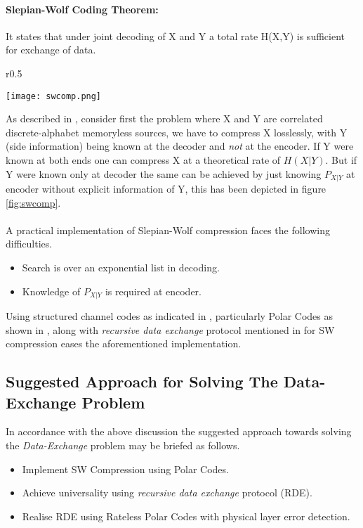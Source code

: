 \documentclass[
11pt, %
a4paper, %
oneside, %
headinclude,footinclude, %
BCOR5mm, %
]{scrartcl}
\begin{document}
\paragraph{Slepian-Wolf Coding Theorem:}It states that under joint decoding of X and Y a total rate H(X,Y) is sufficient for exchange of data.\\
\begin{wrapfigure}{r}{0.5\textwidth}
  \begin{center}
    \texttt{[image: swcomp.png]}
  \end{center}
  \caption{The Slepian-Wolf compression}
  \label{fig:swcomp}
\end{wrapfigure}
As described in \cite{discus}, consider first the problem where X and Y are correlated discrete-alphabet memoryless sources, we have to compress X losslessly, with Y (side information) being known at the decoder and \emph{not} at the encoder. If Y were known at both ends one can compress X at a theoretical rate of $H(X|Y)$. But if Y were known only at decoder the same can be achieved by just knowing $P_{X|Y}$ at encoder without explicit information of Y, this has been depicted in figure \ref{fig:swcomp}. 
\\\\
A practical implementation of Slepian-Wolf compression faces the following difficulties.
\begin{itemize}
\item Search is over an exponential list in decoding.
\item Knowledge of $P_{X|Y}$ is required at encoder.
\end{itemize} 

Using structured channel codes as indicated in \cite{discus}, particularly Polar Codes as shown in \cite{pslep}, along with \emph{recursive data exchange} protocol  mentioned in \cite{htsw} for SW compression eases the aforementioned implementation. 

\subsection{Suggested Approach for Solving The Data-Exchange Problem}\label{suggapp}
In accordance with the above discussion the suggested approach towards solving the \emph{Data-Exchange} problem may be briefed as follows.
\begin{itemize}
\item{Implement SW Compression using Polar Codes.}
\item{Achieve universality using \emph{recursive data exchange} protocol (RDE).}
\item{Realise RDE using Rateless Polar Codes with physical layer error detection.}
\end{itemize}
\end{document}
